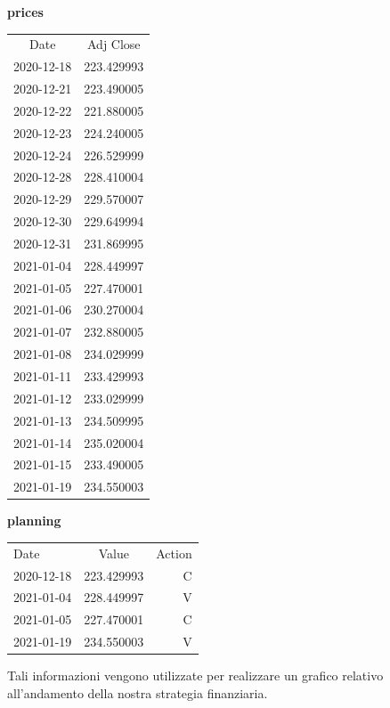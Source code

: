\documentclass{article}
\begin{document}
\begin{center}
\begin{multicols}{2}
\begin{center}
    \textbf{prices} \\
\end{center}
\begin{tabular}{cc}
Date & Adj Close \\
2020-12-18 & 223.429993 \\
2020-12-21 & 223.490005 \\
2020-12-22 & 221.880005 \\
2020-12-23 & 224.240005 \\
2020-12-24 & 226.529999 \\
2020-12-28 & 228.410004 \\
2020-12-29 & 229.570007 \\
2020-12-30 & 229.649994 \\
2020-12-31 & 231.869995 \\
2021-01-04 & 228.449997 \\
2021-01-05 & 227.470001 \\
2021-01-06 & 230.270004 \\
2021-01-07 & 232.880005 \\
2021-01-08 & 234.029999 \\
2021-01-11 & 233.429993 \\
2021-01-12 & 233.029999 \\
2021-01-13 & 234.509995 \\
2021-01-14 & 235.020004 \\
2021-01-15 & 233.490005 \\
2021-01-19 & 234.550003 \\
\end{tabular}
\columnbreak
\begin{center}
    \textbf{planning} \\
\end{center}
    \begin{tabular}{lcr}
    Date & Value & Action\\
    2020-12-18 & 223.429993 & C\\
    2021-01-04 & 228.449997 & V\\
    2021-01-05 & 227.470001 & C\\
    2021-01-19 & 234.550003 & V\\     
    \end{tabular}
\end{multicols}
\end{center}
Tali informazioni vengono utilizzate per realizzare un grafico relativo all'andamento della nostra strategia finanziaria.\\
\end{document}
